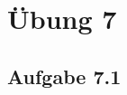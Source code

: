 \documentclass{standalone}
\begin{document}
\section{Übung 7}
\subsection{Aufgabe 7.1}
\end{document}
